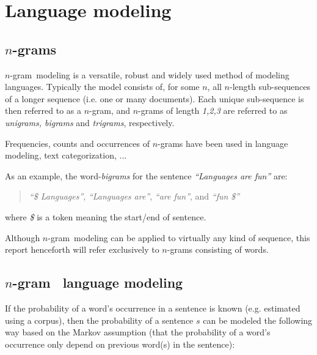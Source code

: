 \documentclass[a4paper,11pt]{kth-mag}
\newcommand{\todo}{ ... }
\newcommand{\ngram}{$n$-gram}
\begin{document}

\section{Language modeling}

\subsection{\ngram s}
\ngram~modeling is a versatile, robust and widely used method of modeling languages. Typically the model consists of, for some $n$, all $n$-length sub-sequences of a longer sequence (i.e. one or many documents). Each unique sub-sequence is then referred to as a \ngram, and \ngram s of length \emph{1,2,3} are referred to as \emph{unigrams, bigrams} and \emph{trigrams}, respectively\cite{ngrams}.

Frequencies, counts and occurrences of \ngram s have been used in language modeling\cite{chen_goodman}, text categorization\cite{ngrams}, \todo

As an example, the word-\emph{bigrams} for the sentence \emph{``Languages are fun''} are:
\begin{quote}
  \vspace*{0.1cm}
  \centering
\emph{``\$ Languages''}, \emph{``Languages are''}, \emph{``are fun''}, and \emph{``fun \$''}
\end{quote}
where \emph{\$} is a token meaning the start/end of sentence.

Although \ngram~modeling can be applied to virtually any kind of sequence, this report henceforth will refer exclusively to \ngram s consisting of words.

\subsection{\ngram~ language modeling}
If the probability of a word's occurrence in a sentence is known (e.g. estimated using a corpus), then the probability of a sentence $s$ can be modeled the following way based on the Markov assumption (that the probability of a word's occurrence only depend on previous word(s) in the sentence):
\end{document}

